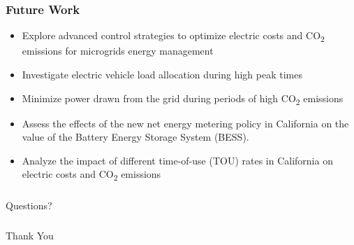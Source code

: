 \documentclass[aspectratio=169, 8 pt]{beamer}
\begin{document}
	\begin{frame}
		\frametitle{Future Work}
		\begin{itemize} \LARGE
			\item Explore advanced control strategies to optimize electric costs and CO\textsubscript{2} emissions for microgrids energy management
			\item Investigate electric vehicle load allocation during high peak times
			\item Minimize power drawn from the grid during periods of high CO\textsubscript{2} emissions
			\item Assess the effects of the new net energy metering policy in California on the value of the Battery Energy Storage System (BESS).
			\item Analyze the impact of different time-of-use (TOU) rates in California on electric costs and CO\textsubscript{2} emissions
		\end{itemize}
	\end{frame}
	
	\begin{frame}
		\frametitle{\null}
		\centering
		\Huge
		Questions?
	\end{frame}
	
	\begin{frame}
		\frametitle{\null}
		\centering
		\Huge
		Thank You
	\end{frame}
\end{document}
